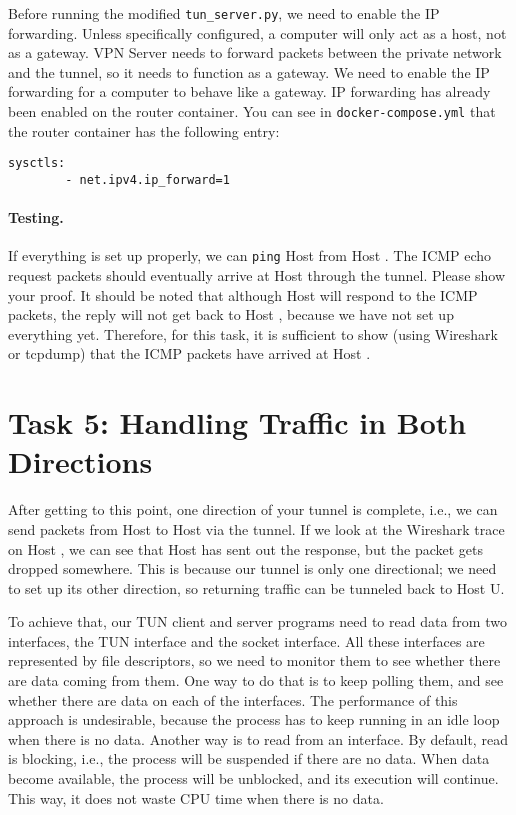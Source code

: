 Before running the modified \texttt{tun\_server.py}, we need to enable the 
IP forwarding. 
Unless specifically configured, a computer will only act as a host, 
not as a gateway. VPN Server needs to forward packets between the private network and the 
tunnel, so it needs to function as a gateway. We need to  
enable the IP forwarding for a computer to behave like a gateway. 
IP forwarding has already been enabled on the router container. 
You can see in \texttt{docker-compose.yml} that the router
container has the following entry:

\begin{lstlisting}
sysctls:
        - net.ipv4.ip_forward=1
\end{lstlisting}


 

\paragraph{Testing.} If everything is set up properly, we can \texttt{ping}
Host \hostv from Host \hostu. The ICMP echo request packets should eventually arrive at Host \hostv
through the tunnel. 
Please show your proof. 
It should be noted that although Host \hostv will respond to the ICMP packets,
the reply will not get back to Host \hostu, because we have not set up everything yet. 
Therefore, for this task, it is sufficient to
show (using Wireshark or tcpdump) that the ICMP packets have arrived at Host \hostv.





\section{Task 5: Handling Traffic in Both Directions}


After getting to this point, one direction of your tunnel is complete, i.e.,
we can send packets from Host \hostu to Host \hostv via the tunnel. If we look at the
Wireshark trace on Host \hostv, we can see that Host \hostv has sent out the 
response, but the packet gets dropped somewhere. This is because 
our tunnel is only one directional; we need to set up its other direction, so returning
traffic can be tunneled back to Host U.


To achieve that, our TUN client and server programs need to read data from two interfaces, 
the TUN interface and the socket interface.  
All these interfaces are represented by file descriptors, so we need to
monitor them to see whether there are data coming from them.
One way to do that is to keep polling them, and
see whether there are data on each of the interfaces. The performance of this approach is
undesirable, because the process has to keep running in an idle loop when there is no data.
Another way is to read from an interface.  By default, read is blocking, i.e., the process will
be suspended if there are no data. When data become available, the process will be unblocked,
and its execution will continue. This way, it does not waste CPU time when there is no data.

